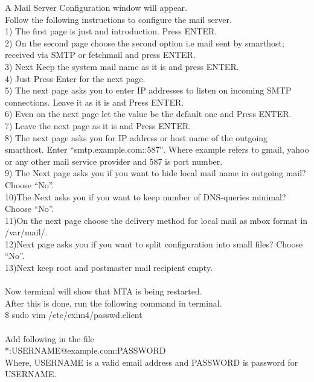 \begin{itemize}
A Mail Server Configuration window will appear.\\
Follow the following instructions to configure the mail server.\\

1) The first page is just and introduction. Press ENTER.\\
2) On the second page choose the second option i.e 
   mail sent by smarthost; received via SMTP or fetchmail and 
   press ENTER.\\
3) Next Keep the system mail name as it is and press ENTER.\\
4) Just Press Enter for the next page.\\
5) The next page asks you to enter IP addresses to listen on
   incoming SMTP connections. Leave it as it is and Press ENTER.\\
6) Even on the next page let the value be the default one and 
   Press ENTER.\\
7) Leave the next page as it is and Press ENTER.\\
8) The next page asks you for IP address or host name of the outgoing
   smarthost. Enter “smtp.example.com::587″. Where example refers to
   gmail, yahoo or any other mail service provider and 587 is port number.\\
9) The Next page asks you if you want to hide local mail name in 
   outgoing mail? Choose “No”.\\
10)The Next asks you if you want to keep number of DNS-queries minimal?
   Choose “No”.\\
11)On the next page choose the  delivery method for local mail as
   mbox format in /var/mail/.\\
12)Next page asks you if you want to split configuration into small
   files? Choose “No”. \\
13)Next keep root and postmaster mail recipient empty.\\\\
Now terminal will show that MTA is being restarted.\\
After this is done, run the following command in terminal.\\
\tab \$ sudo vim /etc/exim4/passwd.client\\\\
Add following in the file\\
*:USERNAME@example.com:PASSWORD\\
Where, USERNAME is  a valid email address and PASSWORD is  password for USERNAME.\\

\end{itemize}

